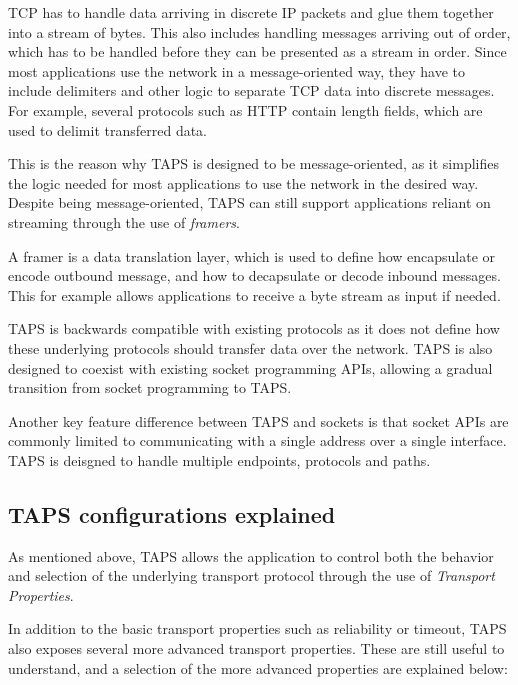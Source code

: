 TCP has to
handle  data arriving in discrete IP packets and glue them together into
a stream of bytes. This also includes handling messages arriving
out of order, which has to be handled before they can be
presented as a stream in order.
Since most applications
use the network in a message-oriented way, they
have to include delimiters and other logic to separate TCP 
data into discrete messages. For example, several protocols
such as HTTP contain length fields, which are used to delimit
transferred data. 

This is the reason why TAPS is designed to be message-oriented,
as it simplifies the logic needed for most applications to
use the network in the desired way. Despite being message-oriented,
TAPS can still support applications reliant on 
streaming through the use of \textit{framers}.

A framer is a data translation layer, which is used to define
how encapsulate or encode outbound message, and how to decapsulate
or decode inbound messages. This for example allows applications
to receive a byte stream as input if needed.

TAPS is backwards compatible with existing protocols as it does not
define how these underlying protocols should transfer data over
the network. TAPS is also designed to coexist with existing
socket programming APIs, allowing a gradual transition from
socket programming to TAPS.

Another key feature difference between TAPS and sockets is that socket
APIs are commonly limited to communicating with a single address over 
a single interface. TAPS is deisgned to handle multiple endpoints,
protocols and paths.


\subsection{TAPS configurations explained}

As mentioned above, TAPS allows the application to control
both the behavior and selection of the underlying transport
protocol through the use of \textit{Transport Properties}.

In addition to the basic transport properties such as reliability
or timeout, TAPS also exposes several more advanced
transport properties. These are still useful to understand,
and a selection of the more advanced properties are explained below:

